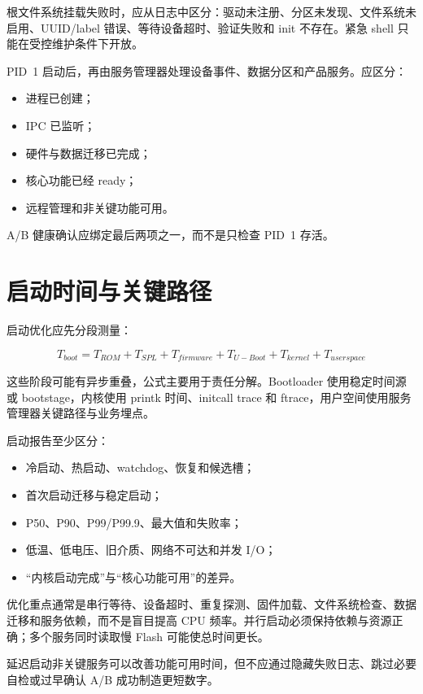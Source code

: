 根文件系统挂载失败时，应从日志中区分：驱动未注册、分区未发现、文件系统未启用、UUID/label 错误、等待设备超时、验证失败和 init 不存在。紧急 shell 只能在受控维护条件下开放。

PID~1 启动后，再由服务管理器处理设备事件、数据分区和产品服务。应区分：

\begin{itemize}
  \item 进程已创建；
  \item IPC 已监听；
  \item 硬件与数据迁移已完成；
  \item 核心功能已经 ready；
  \item 远程管理和非关键功能可用。
\end{itemize}

A/B 健康确认应绑定最后两项之一，而不是只检查 PID~1 存活。

\section{启动时间与关键路径}

启动优化应先分段测量：

\begin{equation}
  T_{boot}=T_{ROM}+T_{SPL}+T_{firmware}+T_{U-Boot}+T_{kernel}+T_{userspace}
\end{equation}

这些阶段可能有异步重叠，公式主要用于责任分解。Bootloader 使用稳定时间源或 bootstage，内核使用 printk 时间、initcall trace 和 ftrace，用户空间使用服务管理器关键路径与业务埋点。

启动报告至少区分：

\begin{itemize}
  \item 冷启动、热启动、watchdog、恢复和候选槽；
  \item 首次启动迁移与稳定启动；
  \item P50、P90、P99/P99.9、最大值和失败率；
  \item 低温、低电压、旧介质、网络不可达和并发 I/O；
  \item “内核启动完成”与“核心功能可用”的差异。
\end{itemize}

优化重点通常是串行等待、设备超时、重复探测、固件加载、文件系统检查、数据迁移和服务依赖，而不是盲目提高 CPU 频率。并行启动必须保持依赖与资源正确；多个服务同时读取慢 Flash 可能使总时间更长。

延迟启动非关键服务可以改善功能可用时间，但不应通过隐藏失败日志、跳过必要自检或过早确认 A/B 成功制造更短数字。


